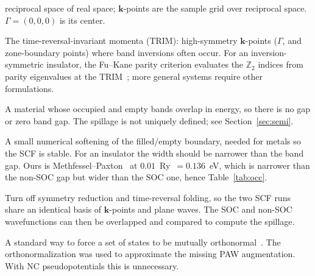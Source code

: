 \documentclass[11pt]{article}
\newcommand{\kk}{\mathbf{k}}
\begin{document}
\begin{description}[leftmargin=0em,style=nextline,itemsep=2pt]
reciprocal space of real space; $\kk$-points are the sample grid over reciprocal space.
$\Gamma=(0,0,0)$ is its center.
\item[TRIM points] The time-reversal-invariant momenta (TRIM): high-symmetry $\kk$-points ($\Gamma$, and
zone-boundary points) where band inversions often occur. For an inversion-symmetric insulator, the
Fu--Kane parity criterion evaluates the $\mathbb{Z}_2$ indices from parity eigenvalues at the
TRIM~\cite{fu2007}; more general systems require other formulations.
\item[Semimetal] A material whose occupied and empty bands overlap in energy, so there is no gap or
zero band gap. The spillage is not uniquely defined; see Section~\ref{sec:semi}.
\item[Smearing width (\texttt{degauss})] A small numerical softening of the filled/empty boundary,
needed for metals so the SCF is stable. For an insulator the width should be narrower than the band
gap. Ours is
Methfessel--Paxton~\cite{methfessel1989} at $0.01$~Ry~$=0.136$~eV, which is narrower than the non-SOC
gap but wider than the SOC one, hence Table~\ref{tab:occ}.
\item[\texttt{nosym} / \texttt{noinv}] Turn off symmetry reduction and time-reversal folding, so the
two SCF runs share an identical basis of $\kk$-points and plane waves. The SOC and non-SOC
wavefunctions can then be overlapped and compared to compute the spillage.
\item[L\"owdin orthonormalization] A standard way to force a set of states to be mutually orthonormal~\cite{lowdin1950}.
The orthonormalization was used to approximate the missing PAW augmentation. With NC
pseudopotentials this is unnecessary.
\end{description}
\end{document}
